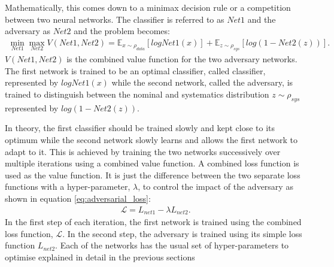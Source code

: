 Mathematically, this comes down to a minimax decision rule or a competition between two neural networks. The classifier is referred to as $Net1$ and the adversary as $Net2$ and the problem becomes:
%
\begin{align}
    \min_{Net1} \max_{Net2} V(Net1, Net2) = \mathbb{E}_{\mathit{x} \sim \rho_{data}} [ log Net1(\mathit{x}) ] + \mathbb{E}_{\mathit{z} \sim \rho_{sys}} [ log (1 - Net2(\mathit{z}) ) ].
\end{align}
%
$V(Net1, Net2)$ is the combined value function for the two adversary networks. The first network is trained to be an optimal classifier, called classifier, represented by $log Net1(\mathit{x})$ while the second network, called the adversary, is trained to distinguish between the nominal and systematics distribution $\mathit{z} \sim \rho_{sys}$ represented by $log (1 - Net2(\mathit{z}))$.

 In theory, the first classifier should be trained slowly and kept close to its optimum while the second network slowly learns and allows the first network to adapt to it. This is achieved by training the two networks successively over multiple iterations using a combined value function.
A combined loss function is used as the value function. It is just the difference between the two separate loss functions with a hyper-parameter, $\lambda$, to control the impact of the adversary as shown in equation \eqref{eq:adversarial_loss}:
%
\begin{align}
    \mathcal{L} = L_{net1} - \lambda L_{net2}.
    \label{eq:adversarial_loss}
\end{align}
%
In the first step of each iteration, the first network is trained using the combined loss function, $\mathcal{L}$. In the second step, the adversary is trained using its simple loss function $L_{net2}$. Each of the networks has the usual set of hyper-parameters to optimise explained in detail in the previous sections

